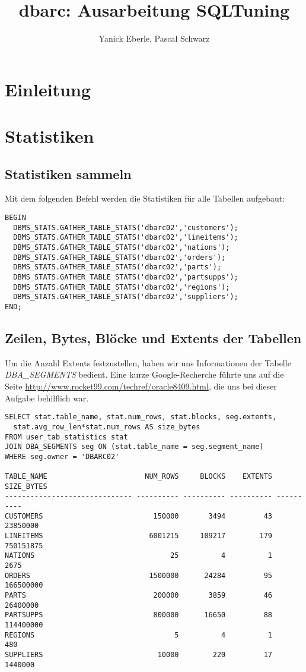 \documentclass[11pt,a4paper,parskip=half]{scrartcl}
\title{dbarc: Ausarbeitung SQLTuning}
\author{Yanick Eberle, Pascal Schwarz}
\begin{document}
\maketitle
\vfill
\tableofcontents

\section{Einleitung}



\section{Statistiken}
\subsection{Statistiken sammeln}
Mit dem folgenden Befehl werden die Statistiken für alle Tabellen aufgebaut:
\begin{lstlisting}
BEGIN
  DBMS_STATS.GATHER_TABLE_STATS('dbarc02','customers');
  DBMS_STATS.GATHER_TABLE_STATS('dbarc02','lineitems');
  DBMS_STATS.GATHER_TABLE_STATS('dbarc02','nations');
  DBMS_STATS.GATHER_TABLE_STATS('dbarc02','orders');
  DBMS_STATS.GATHER_TABLE_STATS('dbarc02','parts');
  DBMS_STATS.GATHER_TABLE_STATS('dbarc02','partsupps');
  DBMS_STATS.GATHER_TABLE_STATS('dbarc02','regions');
  DBMS_STATS.GATHER_TABLE_STATS('dbarc02','suppliers');
END;
\end{lstlisting}

\subsection{Zeilen, Bytes, Blöcke und Extents der Tabellen}
Um die Anzahl Extents festzustellen, haben wir uns Informationen der Tabelle \emph{DBA\_SEGMENTS} bedient. Eine kurze Google-Recherche führte uns auf die Seite \url{http://www.rocket99.com/techref/oracle8409.html}, die uns bei dieser Aufgabe behilflich war.

\begin{lstlisting}
SELECT stat.table_name, stat.num_rows, stat.blocks, seg.extents,
  stat.avg_row_len*stat.num_rows AS size_bytes
FROM user_tab_statistics stat
JOIN DBA_SEGMENTS seg ON (stat.table_name = seg.segment_name)
WHERE seg.owner = 'DBARC02'

TABLE_NAME                       NUM_ROWS     BLOCKS    EXTENTS SIZE_BYTES
------------------------------ ---------- ---------- ---------- ----------
CUSTOMERS                          150000       3494         43   23850000 
LINEITEMS                         6001215     109217        179  750151875 
NATIONS                                25          4          1       2675 
ORDERS                            1500000      24284         95  166500000 
PARTS                              200000       3859         46   26400000 
PARTSUPPS                          800000      16650         88  114400000 
REGIONS                                 5          4          1        480 
SUPPLIERS                           10000        220         17    1440000 
\end{lstlisting}
\end{document}

